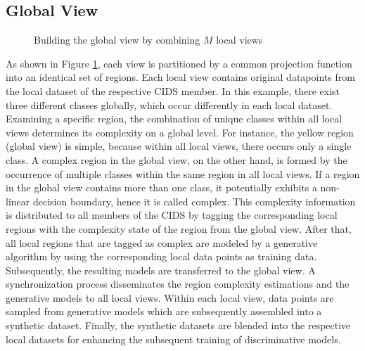 \documentclass[../../main.tex]{subfiles}
\begin{document}
\subsection{Global View}\label{subsec:global_view}

\begin{figure}[b!]
    \centering
    
    \caption{Building the global view by combining $M$ local views}
    \label{fig:global_view}
\end{figure}

As shown in Figure \ref{fig:global_view}, each view is partitioned by a common projection function into an identical set of regions. Each local view contains original datapoints from the local dataset of the respective CIDS member. In this example, there exist three different classes globally, which occur differently in each local dataset. Examining a specific region, the combination of unique classes within all local views determines its complexity on a global level. For instance, the yellow region (global view) is simple, because within all local views, there occurs only a single class. A complex region in the global view, on the other hand, is formed by the occurrence of multiple classes within the same region in all local views. If a region in the global view contains more than one class, it potentially exhibits a non-linear decision boundary, hence it is called complex. This complexity information is distributed to all members of the CIDS by tagging the corresponding local regions with the complexity state of the region from the global view. After that, all local regions that are tagged as complex are modeled by a generative algorithm by using the corresponding local data points as training data. Subsequently, the resulting models are transferred to the global view. A synchronization process disseminates the region complexity estimations and the generative models to all local views. Within each local view, data points are sampled from generative models which are subsequently assembled into a synthetic dataset. Finally, the synthetic datasets are blended into the respective local datasets for enhancing the subsequent training of discriminative models.
\end{document}
